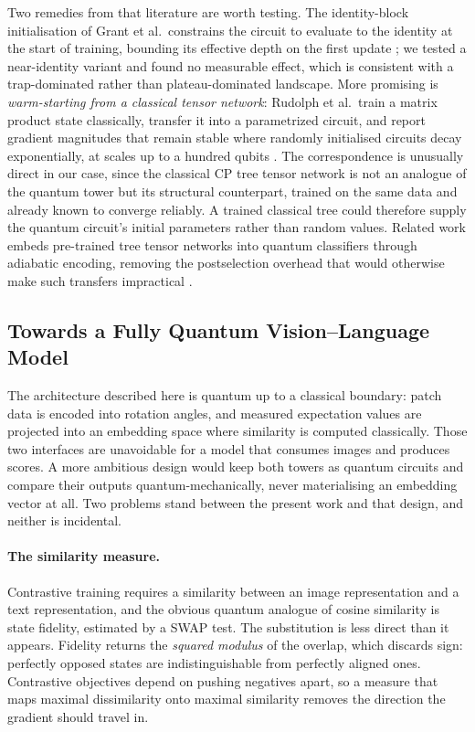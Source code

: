 \documentclass[12pt, a4paper, oneside]{report}
\begin{document}
Two remedies from that literature are worth testing. The identity-block
initialisation of Grant et al.\ constrains the circuit to evaluate to the
identity at the start of training, bounding its effective depth on the first
update \cite{grant2019init}; we tested a near-identity variant and found no
measurable effect, which is consistent with a trap-dominated rather than
plateau-dominated landscape. More promising is \emph{warm-starting from a
classical tensor network}: Rudolph et al.\ train a matrix product state
classically, transfer it into a parametrized circuit, and report gradient
magnitudes that remain stable where randomly initialised circuits decay
exponentially, at scales up to a hundred qubits \cite{rudolph2023pretraining}.
The correspondence is unusually direct in our case, since the classical CP tree
tensor network is not an analogue of the quantum tower but its structural
counterpart, trained on the same data and already known to converge reliably. A
trained classical tree could therefore supply the quantum circuit's initial
parameters rather than random values. Related work embeds pre-trained tree
tensor networks into quantum classifiers through adiabatic encoding, removing
the postselection overhead that would otherwise make such transfers impractical
\cite{murota2025ttn}.

\subsection{Towards a Fully Quantum Vision--Language Model}

The architecture described here is quantum up to a classical boundary: patch
data is encoded into rotation angles, and measured expectation values are
projected into an embedding space where similarity is computed classically.
Those two interfaces are unavoidable for a model that consumes images and
produces scores. A more ambitious design would keep both towers as quantum
circuits and compare their outputs quantum-mechanically, never materialising an
embedding vector at all. Two problems stand between the present work and that
design, and neither is incidental.

\paragraph{The similarity measure.} Contrastive training requires a similarity
between an image representation and a text representation, and the obvious
quantum analogue of cosine similarity is state fidelity, estimated by a SWAP
test. The substitution is less direct than it appears. Fidelity returns the
\emph{squared modulus} of the overlap, which discards sign: perfectly opposed
states are indistinguishable from perfectly aligned ones. Contrastive objectives
depend on pushing negatives apart, so a measure that maps maximal dissimilarity
onto maximal similarity removes the direction the gradient should travel in.
\end{document}
